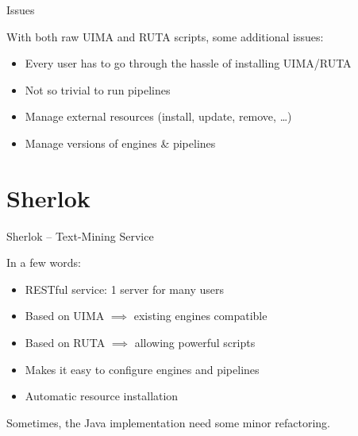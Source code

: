 \documentclass[10pt, compress, xcolor={usenames,dvipsnames}]{beamer}
\newcommand{\SmallArrow}{\ding{228}}
\newcommand{\hence}{\implies}
\renewcommand{\emph}[1]{\alert{#1}}
\newcommand{\light}{\color{TealBlue}}
\begin{document}
\begin{frame}[fragile]{Issues}

  With both raw UIMA and RUTA scripts, some additional issues:

  \vspace{1em}

  \begin{itemize}[label=\SmallArrow, itemsep=1em]

    \item Every user has to go through the hassle of installing UIMA/RUTA

    \item Not so trivial to run pipelines

    \item Manage \emph{external resources} (install, update, remove, \ldots)

    \item Manage versions of engines \& pipelines

  \end{itemize}

\end{frame}

\section{Sherlok}

\begin{frame}[fragile]{Sherlok -- Text-Mining Service}

  In a few words:

  \begin{itemize}[label=\SmallArrow, itemsep=1em]

    \item \emph{RESTful} service: 1 server for many users

    \item Based on UIMA $\hence$ existing engines compatible
      \only<2->{{\light(almost)}}

    \item Based on RUTA $\hence$ allowing powerful scripts

    \item Makes it easy to \emph{configure} engines and pipelines

    \item \emph{Automatic resource} installation

  \end{itemize}

  \pause

  Sometimes, the Java implementation need some {\light minor} refactoring.

\end{frame}
\end{document}
